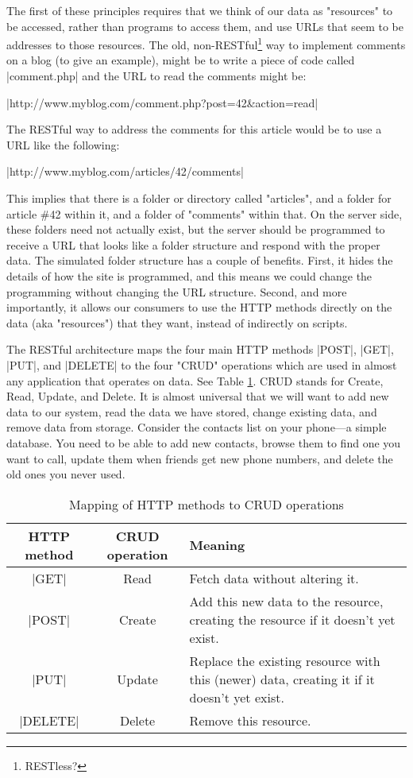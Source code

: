 \documentclass[11pt]{book}
\newcommand{\head}[1]{\textnormal{\textbf{#1}}} %
\begin{document}
The first of these principles requires that we think of our data as "resources" to be accessed, rather than programs to access them, and use URLs that seem to be addresses to those resources.  The old, non-RESTful\footnote{RESTless?} way to implement comments on a blog (to give an example), might be to write a piece of code called |comment.php| and the URL to read the comments might be:

|http://www.myblog.com/comment.php?post=42\&action=read|

The RESTful way to address the comments for this article would be to use a URL like the following:

|http://www.myblog.com/articles/42/comments|

This implies that there is a folder or directory called "articles", and a folder for article \#42 within it, and a folder of "comments" within that.  On the server side, these folders need not actually exist, but the server should be programmed to receive a URL that looks like a folder structure and respond with the proper data.  The simulated folder structure has a couple of benefits.  First, it hides the details of how the site is programmed, and this means we could change the programming without changing the URL structure.  Second, and more importantly, it allows our consumers to use the HTTP methods directly on the data (aka "resources") that they want, instead of indirectly on scripts.

The RESTful architecture maps the four main HTTP methods |POST|, |GET|, |PUT|, and |DELETE| to the four "CRUD" operations which are used in almost any application that operates on data.  See Table \ref{tab:httpcrud}.  CRUD stands for Create, Read, Update, and Delete.  It is almost universal that we will want to add new data to our system, read the data we have stored, change existing data, and remove data from storage.  Consider the contacts list on your phone---a simple database.  You need to be able to add new contacts, browse them to find one you want to call, update them when friends get new phone numbers, and delete the old ones you never used.

\begin{table}
\centering
\caption{Mapping of HTTP methods to CRUD operations}\label{tab:httpcrud}
\vspace{10pt}
\begin{tabular}{ccp{5cm}}
    \toprule[1.5pt]
    \head{HTTP method} & \head{CRUD operation} & \head{Meaning} \\
    \midrule
    |GET| & Read & Fetch data without altering it.\\
    \midrule
    |POST| & Create & Add this new data to the resource, creating the resource if it doesn't yet exist.\\
    \midrule
    |PUT| & Update & Replace the existing resource with this (newer) data, creating it if it doesn't yet exist.\\
    \midrule
    |DELETE| & Delete & Remove this resource.\\
    \bottomrule[1.5pt]
\end{tabular}
\end{table}
 
\end{document}
